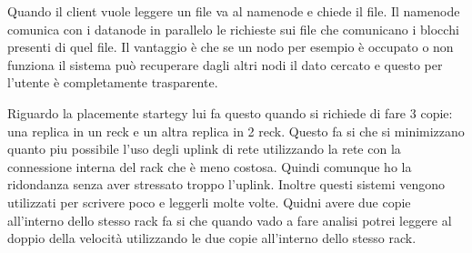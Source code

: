 \documentclass[italian,]{article}
\begin{document}
Quando il client vuole leggere un file va al namenode e chiede il file.
Il namenode comunica con i datanode in parallelo le richieste sui file
che comunicano i blocchi presenti di quel file. Il vantaggio è che se un
nodo per esempio è occupato o non funziona il sistema può recuperare
dagli altri nodi il dato cercato e questo per l'utente è completamente
trasparente.

Riguardo la placemente startegy lui fa questo quando si richiede di fare
3 copie: una replica in un reck e un altra replica in 2 reck. Questo fa
si che si minimizzano quanto piu possibile l'uso degli uplink di rete
utilizzando la rete con la connessione interna del rack che è meno
costosa. Quindi comunque ho la ridondanza senza aver stressato troppo
l'uplink. Inoltre questi sistemi vengono utilizzati per scrivere poco e
leggerli molte volte. Quidni avere due copie all'interno dello stesso
rack fa si che quando vado a fare analisi potrei leggere al doppio della
velocità utilizzando le due copie all'interno dello stesso rack.
\end{document}
